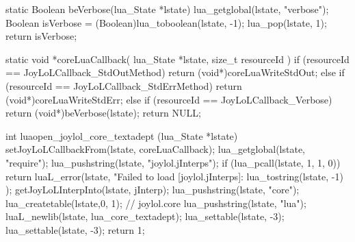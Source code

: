 static Boolean beVerbose(lua_State *lstate) {
  lua_getglobal(lstate, "verbose");
  Boolean isVerbose = (Boolean)lua_toboolean(lstate, -1);
  lua_pop(lstate, 1);
  return isVerbose;
}

static void *coreLuaCallback(
  lua_State *lstate,
  size_t resourceId
) {
  if (resourceId == JoyLoLCallback_StdOutMethod) {
    return (void*)coreLuaWriteStdOut;
  } else if (resourceId == JoyLoLCallback_StdErrMethod) {
    return (void*)coreLuaWriteStdErr;
  } else if (resourceId == JoyLoLCallback_Verbose) {
    return (void*)beVerbose(lstate);
  }
  return NULL;
} 

int luaopen_joylol_core_textadept (lua_State *lstate) {
  setJoyLoLCallbackFrom(lstate, coreLuaCallback);
  lua_getglobal(lstate, "require");
  lua_pushstring(lstate, "joylol.jInterps");
  if (lua_pcall(lstate, 1, 1, 0)) {
    return luaL_error(lstate,
      "Failed to load [joylol.jInterps]\nERROR:\n%
      lua_tostring(lstate, -1)
    );
  }
  getJoyLoLInterpInto(lstate, jInterp);
  lua_pushstring(lstate, "core");
  lua_createtable(lstate,0, 1); // joylol.core 
  lua_pushstring(lstate, "lua");
  luaL_newlib(lstate, lua_core_textadept);
  lua_settable(lstate, -3);
  lua_settable(lstate, -3);
  return 1;
}
\stopCCode